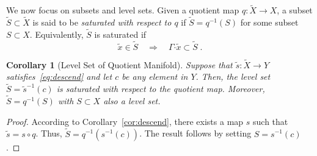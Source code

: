 \documentclass{article}
\newtheorem{corollary}{Corollary}
\theoremstyle{definition}
\theoremstyle{remark}
\newcommand{\bscdot}{\boldsymbol{\cdot}}
\newcommand{\DI}{\tilde{X}}	%
\newcommand{\di}{\tilde{x}}	%
\newcommand{\MA}{X}	%
\newcommand{\MAp}{Y}	%
\newcommand{\SP}{\mathbb{S}}	%
\newcommand{\SW}{S}	%
\newcommand{\SWR}{\tilde{S}}	%
\begin{document}



We now focus on subsets and level sets. Given a quotient map $q : \DI \to \MA$, a subset
$\SWR \subset \DI$ is said to be \emph{saturated with respect to $q$} if $\SWR = q^{-1}(\SW)$
for some subset $S \subset \MA$. Equivalently, $\SWR$ is saturated if
\begin{equation} \label{eq:saturated}
 \di \in \SWR \quad \Longrightarrow \quad \Gamma\bscdot\di \subset \SWR \;.
\end{equation}



\begin{corollary}[Level Set of Quotient Manifold] \label{cor:level_set}
 Suppose that $\tilde{s} : \DI \to \MAp$ satisfies~\eqref{eq:descend} and let $c$ be any element in 
 $\MAp$. Then, the level set $\SWR = \tilde{s}^{-1}(c)$ is saturated with respect to the
 quotient map. Moreover, $\SWR = q^{-1}(\SW)$ with $\SW \subset \MA$ also a level set. 
\end{corollary}

\begin{proof}
 According to Corollary~\ref{cor:descend}, there exists a map $s$ such that $\tilde{s} = s\circ q$. 
 Thus, $\SWR = q^{-1}(s^{-1}(c))$. The result follows by setting $\SW = s^{-1}(c)$.
\end{proof}
\end{document}
